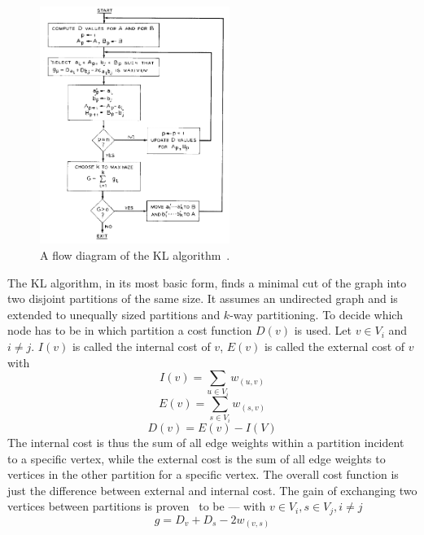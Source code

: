             \begin{figure}[htp]
                \begin{center}
                    \includegraphics[keepaspectratio,width=0.55\textwidth]{img/03-graphs/kl.png}
                \end{center}
                \caption{A flow diagram of the KL algorithm~\autocite{kl}.} 
                \label{kl-fig}
            \end{figure}
                
            The KL algorithm, in its most basic form, finds a minimal cut of the graph into two disjoint partitions of the same size. 
            It assumes an undirected graph and is extended to unequally sized partitions and $k$-way partitioning. 
            To decide which node has to be in which partition a cost function $D(v)$ is used. 
            Let $v  \in V_i$ and $i \neq j$. $I(v)$ is called the internal cost of $v$, $E(v)$ is called the external cost of $v$ with
            \[ I(v) = \sum_{u \in V_i} w_{(u, v)} \]
            \[ E(v) = \sum_{s \in V_i} w_{(s, v)} \]
            \[   D(v) = E(v) - I(V)   \]
            The internal cost is thus the sum of all edge weights within a partition incident to a specific vertex, while the external cost is the sum of all edge weights to vertices in the other partition for a specific vertex. 
            The overall cost function is just the difference between external and internal cost.
            The gain of exchanging two vertices between partitions is proven~\autocite{kl} to be --- with $v \in V_i, s \in V_j, i \neq j$
            \[ g = D_v + D_s - 2 w_{(v,s)} \]
            
